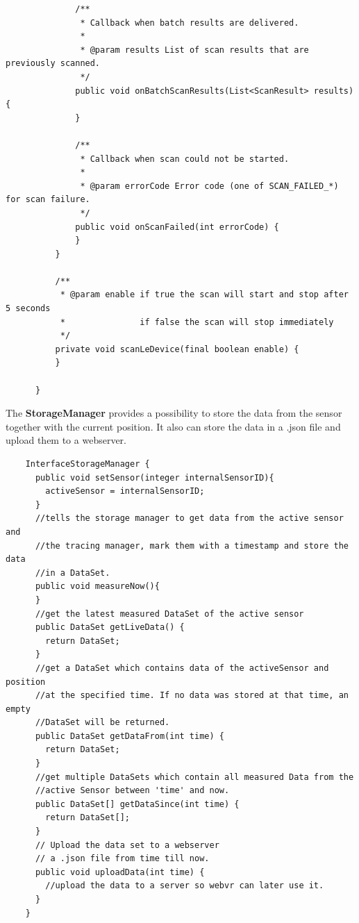 \begin{lstlisting}
              /**
               * Callback when batch results are delivered.
               *
               * @param results List of scan results that are previously scanned.
               */
              public void onBatchScanResults(List<ScanResult> results) {
              }

              /**
               * Callback when scan could not be started.
               *
               * @param errorCode Error code (one of SCAN_FAILED_*) for scan failure.
               */
              public void onScanFailed(int errorCode) {
              }
          }

          /**
           * @param enable if true the scan will start and stop after 5 seconds
           *               if false the scan will stop immediately
           */
          private void scanLeDevice(final boolean enable) {
          }

      }
    \end{lstlisting}

    \noindent The \textbf{StorageManager} provides a possibility to store the data from the sensor together with the current position.
    It also can store the data in a .json file and upload them to a webserver.

    \begin{lstlisting}
    InterfaceStorageManager {
      public void setSensor(integer internalSensorID){
        activeSensor = internalSensorID;
      }
      //tells the storage manager to get data from the active sensor and
      //the tracing manager, mark them with a timestamp and store the data
      //in a DataSet.
      public void measureNow(){
      }
      //get the latest measured DataSet of the active sensor
      public DataSet getLiveData() {
        return DataSet;
      }
      //get a DataSet which contains data of the activeSensor and position
      //at the specified time. If no data was stored at that time, an empty
      //DataSet will be returned.
      public DataSet getDataFrom(int time) {
        return DataSet;
      }
      //get multiple DataSets which contain all measured Data from the
      //active Sensor between 'time' and now.
      public DataSet[] getDataSince(int time) {
        return DataSet[];
      }
      // Upload the data set to a webserver
      // a .json file from time till now.
      public void uploadData(int time) {
        //upload the data to a server so webvr can later use it.
      }
    }
    \end{lstlisting}



